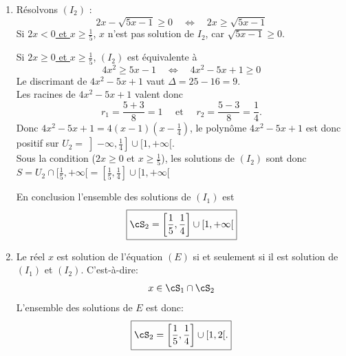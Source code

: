 \begin{correction}
\begin{enumerate}
En conclusion l'ensemble des solutions de $(I_1)$ est 
$$\boxed{ 
\cS_1 = \Big[\frac{1}{5}, \frac{1}{2}\Big[\cup  \Big[\frac{1}{2}, 2\Big[ = \Big[\frac{1}{5}, 2\Big[.$$
}$$



\item  Résolvons $(I_2)$ : 
\begin{equation*}
2x -\sqrt{5x-1}\geq 0\quad \Longleftrightarrow \quad  2x\geq  \sqrt{5x-1} 
\end{equation*}
Si \underline{$2x<0$ et $x\geq \frac{1}{5}$}, $x$ n'est pas solution de $I_2$, car $ \sqrt{5x-1} \geq 0$. 


Si \underline{$2x\geq 0$ et $x\geq \frac{1}{5}$}, $(I_2)$ est équivalente à 
$$4x^2 \geq  5x-1 \quad \Longleftrightarrow \quad  4x^2-5x+1\geq  0 $$ 
Le discrimant de $4x^2-5x+1$ vaut $\Delta= 25 -16= 9$. \\
 Les racines de $4x^2-5x+1$ valent donc 
$$r_1 = \frac{5+3}{8}=1 \quad \text{ et } \quad r_2= \frac{5-3}{8}=\frac{1}{4}.$$
Donc $4x^2-5x+1 = 4(x-1)(x-\frac{1}{4})$, le polynôme $4x^2-5x+1 $ est donc positif  sur $ U_2 =\left]-\infty, \frac{1}{4}\right]\cup[1, +\infty[. $\\
Sous la condition ($2x\geq 0$ et $x\geq \frac{1}{5}$), les solutions de $(I_2)$ sont donc 
$S=U_2\cap [\frac{1}{5},+\infty[= \left[\frac{1}{5}, \frac{1}{4}\right] \cup [1, +\infty [ $

En conclusion l'ensemble des solutions de $(I_1)$ est 
$$\boxed{ 
\cS_2 = \left[\frac{1}{5}, \frac{1}{4}\right] \cup [1, +\infty [ 
}$$
\item Le réel $x$ est solution de l'équation $(E)$ si et seulement si il est solution de $(I_1)$ et $(I_2)$. C'est-à-dire: 
$$x\in \cS_1\cap \cS_2$$
L'ensemble des solutions de $E$ est donc:
$$\boxed{ 
\cS_2 = \left[\frac{1}{5}, \frac{1}{4}\right] \cup [1,2[.
}$$




\end{enumerate}
\end{correction}






